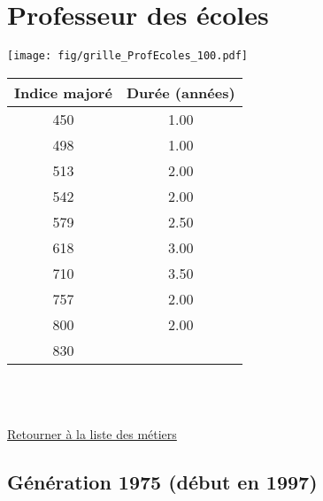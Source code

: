\newpage 
 
\chapter{Professeur des écoles} 

\begin{minipage}{0.55\linewidth}\texttt{[image: fig/grille\_ProfEcoles\_100.pdf]}\end{minipage} 
\begin{minipage}{0.3\linewidth} 
 \begin{center} 

\begin{tabular}[htb]{|c|c|} 
\hline 
 Indice majoré &  Durée (années) \\ 
\hline \hline 
 450 &  1.00 \\ 
\hline 
 498 &  1.00 \\ 
\hline 
 513 &  2.00 \\ 
\hline 
 542 &  2.00 \\ 
\hline 
 579 &  2.50 \\ 
\hline 
 618 &  3.00 \\ 
\hline 
 710 &  3.50 \\ 
\hline 
 757 &  2.00 \\ 
\hline 
 800 &  2.00 \\ 
\hline 
 830 &   \\ 
\hline 
\hline 
\end{tabular} 
\end{center} 
 \end{minipage} 

~\\ 
 


   
 \localtableofcontents 

~\\ 
 
 \hyperlink{page.2}{\noindent Retourner à la liste des métiers}

 \newpage 

\section{Génération 1975 (début en 1997)\label{ProfEcoles_100_1975_22_0}} 
 
